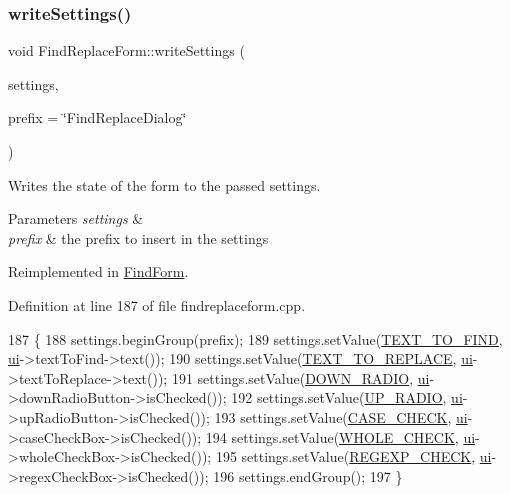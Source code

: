 \subsubsection{\texorpdfstring{write\+Settings()}{writeSettings()}}
{\footnotesize\ttfamily void Find\+Replace\+Form\+::write\+Settings (\begin{DoxyParamCaption}\item[{Q\+Settings \&}]{settings,  }\item[{const Q\+String \&}]{prefix = {\ttfamily \char`\"{}FindReplaceDialog\char`\"{}} }\end{DoxyParamCaption})\hspace{0.3cm}{\ttfamily [virtual]}}

Writes the state of the form to the passed settings. 
\begin{DoxyParams}{Parameters}
{\em settings} & \\
\hline
{\em prefix} & the prefix to insert in the settings \\
\hline
\end{DoxyParams}


Reimplemented in \hyperlink{class_find_form_a8d9f1b06d14a58d2d2a91d1d82205b4d}{Find\+Form}.



Definition at line 187 of file findreplaceform.\+cpp.


\begin{DoxyCode}
187                                                                               \{
188     settings.beginGroup(prefix);
189     settings.setValue(\hyperlink{findreplaceform_8cpp_ad0e85b6e1a23bc6895c0b0173fe84fb8}{TEXT\_TO\_FIND}, \hyperlink{class_find_replace_form_a9bf9e9096feff863dcd6c2a989e07d2c}{ui}->textToFind->text());
190     settings.setValue(\hyperlink{findreplaceform_8cpp_ae47c14ca9975586733a09e6d551dad02}{TEXT\_TO\_REPLACE}, \hyperlink{class_find_replace_form_a9bf9e9096feff863dcd6c2a989e07d2c}{ui}->textToReplace->text());
191     settings.setValue(\hyperlink{findreplaceform_8cpp_a47c8ca9e44c58a42f6fe68e4203a013e}{DOWN\_RADIO}, \hyperlink{class_find_replace_form_a9bf9e9096feff863dcd6c2a989e07d2c}{ui}->downRadioButton->isChecked());
192     settings.setValue(\hyperlink{findreplaceform_8cpp_a8c493bff457c3ec968f611c4d562e2ba}{UP\_RADIO}, \hyperlink{class_find_replace_form_a9bf9e9096feff863dcd6c2a989e07d2c}{ui}->upRadioButton->isChecked());
193     settings.setValue(\hyperlink{findreplaceform_8cpp_a187fe30bbd8393046e13732d0ced8e39}{CASE\_CHECK}, \hyperlink{class_find_replace_form_a9bf9e9096feff863dcd6c2a989e07d2c}{ui}->caseCheckBox->isChecked());
194     settings.setValue(\hyperlink{findreplaceform_8cpp_a30b2264592edd78f0d0a3a9b67cdfaf8}{WHOLE\_CHECK}, \hyperlink{class_find_replace_form_a9bf9e9096feff863dcd6c2a989e07d2c}{ui}->wholeCheckBox->isChecked());
195     settings.setValue(\hyperlink{findreplaceform_8cpp_a19c3030804a7b73372b7d4de85d75804}{REGEXP\_CHECK}, \hyperlink{class_find_replace_form_a9bf9e9096feff863dcd6c2a989e07d2c}{ui}->regexCheckBox->isChecked());
196     settings.endGroup();
197 \}
\end{DoxyCode}



